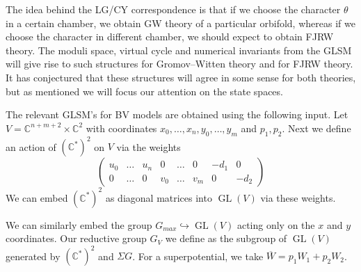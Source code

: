 \documentclass[10pt, letterpaper]{amsart}
\theoremstyle{remark}
\newcommand{\CC}{\mathbb C}
\newcommand{\QQ}{\mathbb{Q}}
\newcommand{\cX}{\mathcal{X}}
\newcommand{\sH}{\mathscr{H}}
\newcommand{\s}[1]{\Sigma #1}
\DeclareMathOperator{\GL}{GL}
\newcommand{\nathan}[1]{\todo[color=pistachio,fancyline]{N:#1}}
\begin{document}
The idea behind the LG/CY correspondence is that if we choose the character $\theta$ in a certain chamber, we obtain GW theory of a particular orbifold, whereas if we choose the character in different chamber, we should expect to obtain FJRW theory. 
The moduli space, virtual cycle and numerical invariants from the GLSM will give rise to such structures for Gromov--Witten theory and for FJRW theory. It has conjectured that these structures will agree in some sense  for both theories, but as mentioned we will focus our attention on the state spaces. 



The relevant GLSM's for BV models are obtained using the following input. Let $V=\CC^{n+m+2}\times \CC^2$ with coordinates $x_0,\dots,x_n,y_0,\dots,y_m$ and $p_1,p_2$. Next we define an action of $(\CC^*)^2$ on $V$ via the weights
\[
\left(\begin{matrix}
u_0 & \dots & u_n & 0 & \dots & 0 & -d_1 & 0\\
0 & \dots & 0 & v_0 & \dots & v_m & 0 & -d_2  
\end{matrix}
\right)
\]
We can embed $(\CC^*)^2$ as diagonal matrices into $\GL(V)$ via these weights.

We can similarly embed the group $G_{max}\hookrightarrow \GL(V)$ acting only on the $x$ and $y$ coordinates. Our reductive group $G_V$ we define as the subgroup of $\GL(V)$ generated by $(\CC^*)^2$ and $\s{G}$. 
For a superpotential, we take $\overline{W}=p_1W_1 + p_2W_2$. %
\end{document}
